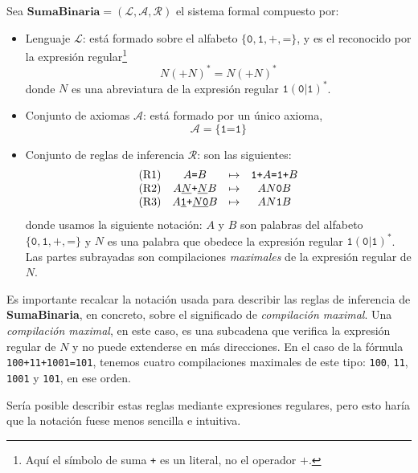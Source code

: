 \begin{sistemaformal}\label{sf:suma-binaria}
Sea $\textbf{SumaBinaria}=(\mathcal{L}, \mathcal{A}, \mathcal{R})$ el sistema formal compuesto por:

\begin{itemize}
    \item Lenguaje $\mathcal{L}$: está formado sobre el alfabeto $\{\texttt{0}, \texttt{1}, \texttt{+}, \texttt{=}\}$, y es el reconocido por la expresión regular\footnote{Aquí el símbolo de suma \texttt{+} es un literal, no el operador $+$.}
    $$
        N(\texttt{+}N)^*=N(\texttt{+}N)^*
    $$
    donde $N$ es una abreviatura de la expresión regular $\texttt{1}(\texttt{0}|\texttt{1})^*$.
    \item Conjunto de axiomas $\mathcal{A}$: está formado por un único axioma,
    $$
        \mathcal{A} = \{\texttt{1=1}\}
    $$
    \item Conjunto de reglas de inferencia $\mathcal{R}$: son las siguientes:
    $$
    \begin{matrix}
    \text{(R1)} & A\texttt{=}B & \mapsto & \texttt{1+}A\texttt{=}\texttt{1+}B \\
    \text{(R2)} & A\underline{N}\texttt{+}\underline{N}B & \mapsto & AN\texttt{0}B \\
    \text{(R3)} & A\texttt{\underline{1}+}\underline{N\texttt{0}}B & \mapsto & AN\texttt{1}B
    \end{matrix}
    $$
    donde usamos la siguiente notación: $A$ y $B$ son palabras del alfabeto $\{\texttt{0}, \texttt{1}, \texttt{+}, \texttt{=}\}$ y $N$ es una palabra que obedece la expresión regular $\texttt{1}(\texttt{0}|\texttt{1})^*$. Las partes subrayadas son compilaciones \emph{maximales} de la expresión regular de $N$.
\end{itemize}
\end{sistemaformal}

Es importante recalcar la notación usada para describir las reglas de inferencia de \textbf{SumaBinaria}, en concreto, sobre el significado de \textit{compilación maximal}. Una \textit{compilación maximal}, en este caso, es una subcadena que verifica la expresión regular de $N$ y no puede extenderse en más direcciones. En el caso de la fórmula \texttt{100+11+1001=101}, tenemos cuatro compilaciones maximales de este tipo: \texttt{100}, \texttt{11}, \texttt{1001} y \texttt{101}, en ese orden.

Sería posible describir estas reglas mediante expresiones regulares, pero esto haría que la notación fuese menos sencilla e intuitiva.

